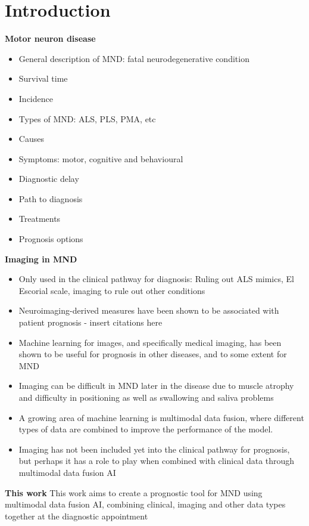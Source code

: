 \chapter{Introduction}
\label{introduction}

\textbf{Motor neuron disease}

\begin{itemize}
    \item General description of MND: fatal neurodegenerative condition
    \item Survival time
    \item Incidence
    \item Types of MND: ALS, PLS, PMA, etc
    \item Causes
    \item Symptoms: motor, cognitive and behavioural
    \item Diagnostic delay
    \item Path to diagnosis
    \item Treatments
    \item Prognosis options
\end{itemize}

\textbf{Imaging in MND}
\begin{itemize}
    \item Only used in the clinical pathway for diagnosis: Ruling out ALS mimics, El Escorial scale, imaging to rule out other conditions
    \item Neuroimaging-derived measures have been shown to be associated with patient prognosis - insert citations here
    \item Machine learning for images, and specifically medical imaging, has been shown to be useful for prognosis in other diseases, and to some extent for MND
    \item Imaging can be difficult in MND later in the disease due to muscle atrophy and difficulty in positioning as well as swallowing and saliva problems
    \item A growing area of machine learning is multimodal data fusion, where different types of data are combined to improve the performance of the model.
    \item Imaging has not been included yet into the clinical pathway for prognosis, but perhaps it has a role to play when combined with clinical data through multimodal data fusion AI
\end{itemize}

\textbf{This work}
This work aims to create a prognostic tool for MND using multimodal data fusion AI, combining clinical, imaging and other data types together at the diagnostic appointment


